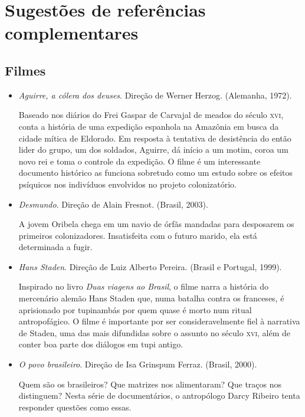\documentclass[12pt]{extarticle}
\begin{document}
{\section{Sugestões de referências complementares}\label{sugestoes}

\subsection{Filmes} 
\begin{itemize}

	\item \emph{Aguirre, a cólera dos deuses}. Direção de Werner Herzog. 
	(Alemanha, 1972).

	Baseado nos diários do Frei Gaspar de Carvajal de meados do século 
	\textsc{xvi}, conta a história de uma expedição espanhola na Amazônia 
	em busca da cidade mítica de Eldorado. Em resposta à tentativa de 
	desistência do então lider do grupo, um dos	soldados, Aguirre, dá 
	início a um motim, coroa um novo rei e toma o controle da expedição. 
	O filme é um interessante documento histórico as funciona sobretudo 
	como um estudo sobre os efeitos psíquicos nos indivíduos envolvidos 
	no projeto colonizatório.

	\item \emph{Desmundo}. Direção de Alain Fresnot. (Brasil, 2003).

	A jovem Oribela chega em um navio de órfãs mandadas para desposarem os
	primeiros colonizadores. Insatisfeita com o futuro marido, ela está
	determinada a fugir.

	\item \emph{Hans Staden}. Direção de Luiz Alberto Pereira. (Brasil e 
	Portugal, 1999).

	Inspirado no livro \emph{Duas viagens ao Brasil}, o filme narra a história
	do mercenário alemão Hans Staden que, numa batalha contra os franceses,
	é aprisionado por tupinambás por quem quase é morto num ritual antropofágico.
	O filme é importante por ser consideravelmente fiel à narrativa de
	Staden, uma das mais difundidas sobre o assunto no século \textsc{xvi},
	além de conter boa parte dos diálogos em tupi antigo.

	\item \emph{O povo brasileiro}. Direção de Isa Grinspum Ferraz. (Brasil, 2000).

	Quem são os brasileiros? Que matrizes nos alimentaram? Que traços nos
	distinguem? Nesta série de documentários, o antropólogo Darcy Ribeiro
	tenta responder questões como essas.


\end{itemize}}
\end{document}
